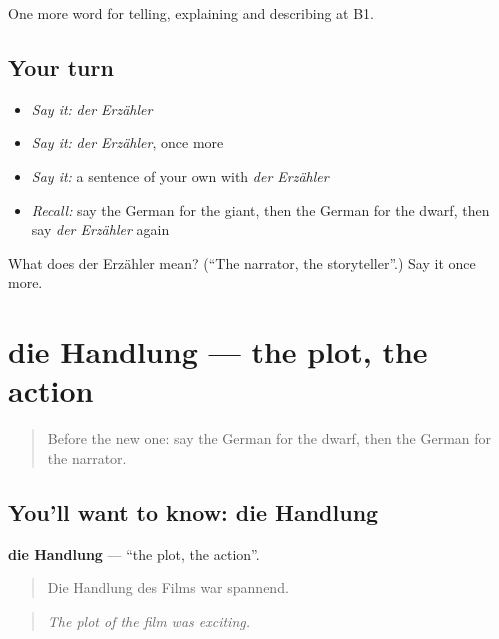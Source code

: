 \begin{grammarlens}[title={What you've built}]
One more word for telling, explaining and describing at B1.
\end{grammarlens}

\subsection*{Your turn}
\begin{itemize}
\raggedright
  \item \emph{Say it:} \emph{der Erzähler}
  \item \emph{Say it:} \emph{der Erzähler}, once more
  \item \emph{Say it:} a sentence of your own with \emph{der Erzähler}
  \item \emph{Recall:} say the German for the giant, then the German for the dwarf, then say \emph{der Erzähler} again
\end{itemize}

\begin{tcolorbox}[breakable,colback=teal!4,colframe=teal!35!black,title={Before you move on}]
What does der Erzähler mean? (\textquotedblleft{}The narrator, the storyteller\textquotedblright{}.) Say it once more.
\end{tcolorbox}
\section[die Handlung]{die Handlung — the plot, the action}

\label{lesson:GE-C316-handlung}



\begin{quote}
Before the new one: say the German for the dwarf, then the German for the narrator.
\end{quote}

\subsection*{You'll want to know: die Handlung}
\textbf{die Handlung} — \textquotedblleft{}the plot, the action\textquotedblright{}.

\begin{quote}
Die Handlung des Films war spannend.
\end{quote}

\begin{quote}
\emph{The plot of the film was exciting.}
\end{quote}

